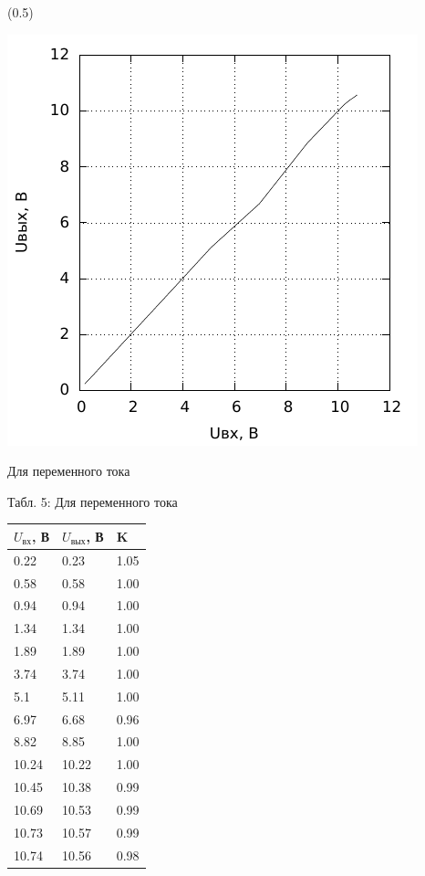 \sidefig(0.5\textwidth){\includegraphics[scale=1.2]{5.pdf}
\caption{Для переменного тока}}
{Табл. 5: Для переменного тока

\begin{tabular}{|l|l|l|}
\hline
$U_{вх}$, В & $U_{вых}$, В & K \\
\hline
0.22&0.23&1.05\\
\hline
0.58&0.58&1.00\\
\hline
0.94&0.94&1.00\\
\hline
1.34&1.34&1.00\\
\hline
1.89&1.89&1.00\\
\hline
3.74&3.74&1.00\\
\hline
5.1&5.11&1.00\\
\hline
6.97&6.68&0.96\\
\hline
8.82&8.85&1.00\\
\hline
10.24&10.22&1.00\\
\hline
10.45&10.38&0.99\\
\hline
10.69&10.53&0.99\\
\hline
10.73&10.57&0.99\\
\hline
10.74&10.56&0.98\\
\hline
\end{tabular}}

